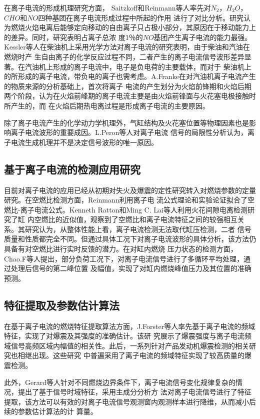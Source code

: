 在离子电流的形成机理研究方面， Saitzkoff和Reinmann等人\cite{saitzkoff1996ionization}率先对$N_{2}$，$H_{2}O$，$CHO$和$NO$四种基团在离子电流形成过程中所起的作用
进行了对比分析。研究认为燃烧火焰电离后能够定向移动的自由离子只占极小部分，其原因在于移动能力上的差异。同时，研究表明占离子总浓
度1％的$NO$基团产生离子电流的能力最强。Kessler等人\cite{kessler}在柴油机上采用光学方法对离子电流的研究表明，由于柴油和汽油在燃烧时产
生自由离子的化学反应过程不同，二者产生的离子电流信号波形差异显著。在汽油机上形成的离子电流中，电子是负电荷的主要载体，而对于
柴油机上的所形成的离子电流，带负电的离子也需考虑。A.Franke\cite{franke2003analysis}在对汽油机离子电流产生的物质来源的分析基础上，首次将离子
电流的产生划分为火焰前锋期和火焰后期两个阶段，认为在火焰前峰期的离子电流主要是由火焰前锋面与火花塞电极接触时所产生的，而
在火焰后期热电离过程是形成离子电流的主要原因。

除了离子电流产生的化学动力学机理外，气缸结构及火花塞位置等物理因素也是影响离子电流波形的重要成因。L.Peron等人\cite{peron2000limitations}对离子电流
信号的局限性分析认为，离子电流生成机理并不是决定信号波形的唯一原因。
\subsection{基于离子电流的检测应用研究}
目前对离子电流的应用已经从初期对失火及爆震的定性研究转入对燃烧参数的定量研究。在空燃比检测方面，Reinmann\cite{reinmann1997local}利用离子电
流公式理论和实验论证拟合了空燃比-离子电流公式。Kenneth Ratton和Ming C. Lai等人\cite{balles1998cylinder}利用火花间隙电离检测研究了缸
内空燃比的近似值，观察到了空燃比和离子电流特征之间的较强相互关系。其研究认为，从整体性能上看，离子电流检测无法取代缸压检测，二者
信号质量和性质都完全不同。但通过具体工况下对离子电流波形的具体分析，该方法仍具备有对空燃比进行实时反馈的潜力。在对缸内燃烧
压力状态的检测方面，Chao.F等人\cite{zhu2003mbt}提出，部分负荷工况下，对离子电流信号进行了多循环平均处理，通过处理后信号的第二峰位置
及幅值，实现了对缸内燃烧峰值压力及其位置的准确预测。
\subsection{特征提取及参数估计算法}
在基于离子电流的燃烧特征提取算法方面，J.Forster等人\cite{forster1999ion}率先基于离子电流的频域特征，实现了对爆震及其强度的准确估计。该研
究展示了爆震强度与离子电流频域信号高频区域内幅值的相关性。此后，一系列针对产品发动机爆震检测的相关研究也相继出现。这些研究
中普遍采用了离子电流的频域特征实现了较高质量的爆震检测。

此外，Gerard等人\cite{malaczynski2003real}针对不同燃烧边界条件下，离子电流信号变化规律复杂的情况，提出了基于信号时域特征，采用主成分分析方
法对离子电流信号进行了特征提取，该方法可以有效的对离子电流信号观测窗内观测样本进行降维，从而减小后续的参数估计算法的计
算量。

